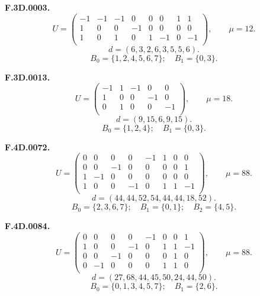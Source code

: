 \par\medskip\noindent\begin{minipage}{\linewidth}\textbf{F.3D.0003.}
\begingroup\small\setlength{\arraycolsep}{3pt}
\[U=\begin{pmatrix}
-1 & -1 & -1 & 0 & 0 & 0 & 1 & 1\\
1 & 0 & 0 & -1 & 0 & 0 & 0 & 0\\
1 & 0 & 1 & 0 & 1 & -1 & 0 & -1\\
\end{pmatrix},\qquad \mu=12.\]
\[d=(6,3,2,6,3,5,5,6).\]
\[B_0=\{1,2,4,5,6,7\};\quad B_1=\{0,3\}.\]
\endgroup\end{minipage}\par
\par\medskip\noindent\begin{minipage}{\linewidth}\textbf{F.3D.0013.}
\begingroup\small\setlength{\arraycolsep}{3pt}
\[U=\begin{pmatrix}
-1 & 1 & -1 & 0 & 0\\
1 & 0 & 0 & -1 & 0\\
0 & 1 & 0 & 0 & -1\\
\end{pmatrix},\qquad \mu=18.\]
\[d=(9,15,6,9,15).\]
\[B_0=\{1,2,4\};\quad B_1=\{0,3\}.\]
\endgroup\end{minipage}\par
\par\medskip\noindent\begin{minipage}{\linewidth}\textbf{F.4D.0072.}
\begingroup\small\setlength{\arraycolsep}{3pt}
\[U=\begin{pmatrix}
0 & 0 & 0 & 0 & -1 & 1 & 0 & 0\\
0 & 0 & -1 & 0 & 0 & 0 & 0 & 1\\
1 & -1 & 0 & 0 & 0 & 0 & 0 & 0\\
1 & 0 & 0 & -1 & 0 & 1 & 1 & -1\\
\end{pmatrix},\qquad \mu=88.\]
\[d=(44,44,52,54,44,44,18,52).\]
\[B_0=\{2,3,6,7\};\quad B_1=\{0,1\};\quad B_2=\{4,5\}.\]
\endgroup\end{minipage}\par
\par\medskip\noindent\begin{minipage}{\linewidth}\textbf{F.4D.0084.}
\begingroup\small\setlength{\arraycolsep}{3pt}
\[U=\begin{pmatrix}
0 & 0 & 0 & 0 & -1 & 0 & 0 & 1\\
1 & 0 & 0 & -1 & 0 & 1 & 1 & -1\\
0 & 0 & -1 & 0 & 0 & 0 & 1 & 0\\
0 & -1 & 0 & 0 & 0 & 1 & 1 & 0\\
\end{pmatrix},\qquad \mu=88.\]
\[d=(27,68,44,45,50,24,44,50).\]
\[B_0=\{0,1,3,4,5,7\};\quad B_1=\{2,6\}.\]
\endgroup\end{minipage}\par
